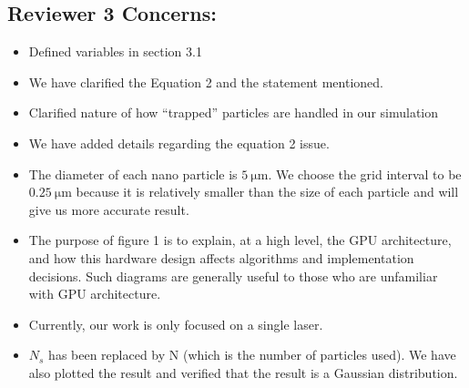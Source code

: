\documentclass[10pt]{article}
\begin{document}
\subsection*{Reviewer 3 Concerns:}
\begin{itemize}

\item Defined variables in section 3.1

\item 
	We have clarified the Equation 2 and the statement mentioned.


\item Clarified nature of how ``trapped'' particles are handled in our simulation

\item 
	We have added details regarding the equation 2 issue.

\item 
 The diameter of each nano particle is $\SI{5}{\micro\meter}$. We choose the grid interval to be $\SI{0.25}{\micro\meter}$
  because it is relatively smaller than the size of each particle and will give us more accurate result.


\item The purpose of figure 1 is to explain, at a high level, the GPU
  architecture, and how this hardware design affects algorithms and
  implementation decisions.  Such diagrams are generally useful to
  those who are unfamiliar with GPU architecture.

\item 
Currently, our work is only focused on a single laser. 

\item 
$N_{s}$ has been replaced by N (which is the number of particles used).
 We have also plotted the result and verified that the result is a Gaussian distribution.



\end{itemize}
\end{document}
